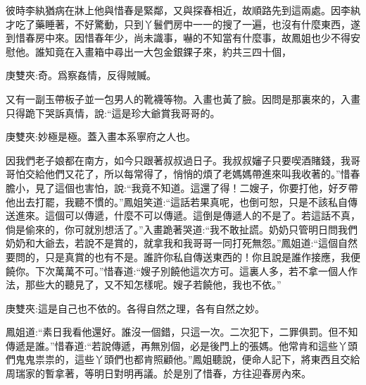 \begin{parag}
\end{parag}


\begin{parag}
    彼時李紈猶病在牀上他與惜春是緊鄰，又與探春相近，故順路先到這兩處。因李紈才吃了藥睡著，不好驚動，只到丫鬟們房中一一的搜了一遍，也沒有什麼東西，遂到惜春房中來。因惜春年少，尚未識事，嚇的不知當有什麼事，故鳳姐也少不得安慰他。誰知竟在入畫箱中尋出一大包金銀錁子來，約共三四十個，\begin{note}庚雙夾:奇。爲察姦情，反得賊贓。\end{note}又有一副玉帶板子並一包男人的靴襪等物。入畫也黃了臉。因問是那裏來的，入畫只得跪下哭訴真情，說:“這是珍大爺賞我哥哥的。\begin{note}庚雙夾:妙極是極。蓋入畫本系寧府之人也。\end{note}因我們老子娘都在南方，如今只跟著叔叔過日子。我叔叔嬸子只要喫酒賭錢，我哥哥怕交給他們又花了，所以每常得了，悄悄的煩了老媽媽帶進來叫我收著的。”惜春膽小，見了這個也害怕，說:“我竟不知道。這還了得！二嫂子，你要打他，好歹帶他出去打罷，我聽不慣的。”鳳姐笑道:“這話若果真呢，也倒可恕，只是不該私自傳送進來。這個可以傳遞，什麼不可以傳遞。這倒是傳遞人的不是了。若這話不真，倘是偷來的，你可就別想活了。”入畫跪著哭道:“我不敢扯謊。奶奶只管明日問我們奶奶和大爺去，若說不是賞的，就拿我和我哥哥一同打死無怨。”鳳姐道:“這個自然要問的，只是真賞的也有不是。誰許你私自傳送東西的！你且說是誰作接應，我便饒你。下次萬萬不可。”惜春道:“嫂子別饒他這次方可。這裏人多，若不拿一個人作法，那些大的聽見了，又不知怎樣呢。嫂子若饒他，我也不依。”\begin{note}庚雙夾:這是自己也不依的。各得自然之理，各有自然之妙。\end{note}鳳姐道:“素日我看他還好。誰沒一個錯，只這一次。二次犯下，二罪俱罰。但不知傳遞是誰。”惜春道:“若說傳遞，再無別個，必是後門上的張媽。他常肯和這些丫頭們鬼鬼祟祟的，這些丫頭們也都肯照顧他。”鳳姐聽說，便命人記下，將東西且交給周瑞家的暫拿著，等明日對明再議。於是別了惜春，方往迎春房內來。
\end{parag}


